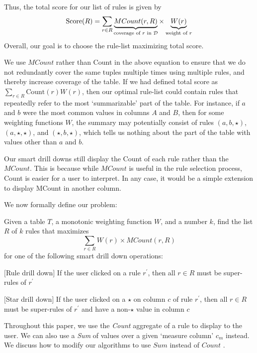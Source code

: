 Thus, the total score for our list of rules is given by 
$$\text{Score}(R) = \sum_{r \in R} \underbrace{MCount(r, R)}_{\text{coverage of $r$ in $\mathcal{D}$}} \times \underbrace{W(r)}_{\text{weight of $r$}}$$ 
Overall, our goal is to choose the rule-list maximizing 
total score. 


We use $MCount$ rather than Count in the above equation to ensure that we do not redundantly cover
the same tuples multiple times using multiple rules, and thereby increase coverage of the table. 
If we had defined total score as $\sum_{r \in R} \text{Count}(r)W(r)$, then our optimal rule-list could 
contain rules that repeatedly refer to the most `summarizable' part of the table. 
For instance, if $a$ and $b$ were the most common values in columns $A$ and $B$, then 
for some weighting functions $W$, 
the summary may potentially consist of rules $(a, b, \star)$, $(a, \star, \star)$, and $(\star, b, \star)$, which tells us nothing about the part of the table with values other than $a$ and $b$. 

Our smart drill downs still display the Count of each rule rather than the $MCount$. This is because while $MCount$ is useful in the rule selection process, Count is easier for a user to interpret. In any case, it would be a simple extension to display MCount in another column.

 We now formally define our problem:
\begin{problem}\label{prob:optimal-subrule-list}
Given a table $T$, a monotonic weighting function $W$, and a number $k$, find the list $R$ of $k$ rules that maximizes 
$$\sum_{r \in R} W(r) \times MCount(r,R)$$
for one of the following smart drill down operations:
\begin{denselist}
\item $[$Rule drill down$]$ If the user clicked on a rule $r^{\prime}$, then all $r \in R$ must be super-rules of $r^{\prime}$
\item $[$Star drill down$]$ If the user clicked on a $\star$ on column $c$ of rule $r^{\prime}$, then all $r \in R$ must be super-rules of $r^{\prime}$ and have a non-$\star$ value in column $c$
\end{denselist}
\end{problem}
\noindent Throughout this paper, we use the {\em Count} aggregate of a rule to display to the user. We can also use a {\em Sum} of values over a given `measure column' $c_m$ instead. We discuss how to modify our algorithms to use $Sum$ instead of $Count$ 
.


